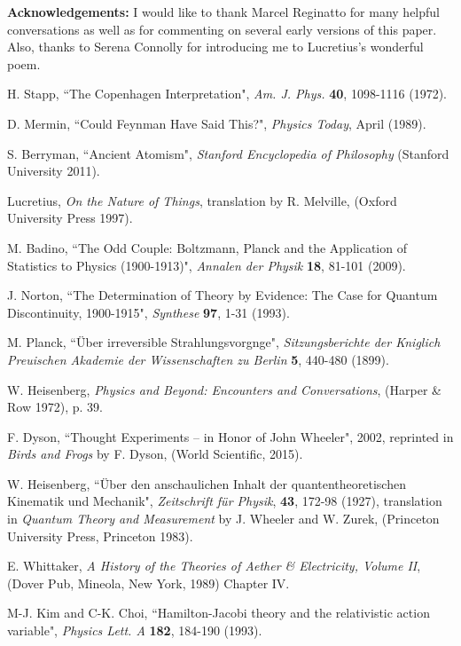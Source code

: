 \documentclass[12pt]{article}
\begin{document}
\textbf{Acknowledgements:}
I would like to thank Marcel Reginatto for many helpful conversations as well as for commenting on several early versions of this paper.  Also, thanks to Serena Connolly for introducing me to Lucretius's wonderful poem.

\begin{thebibliography}{99}

 H. Stapp, ``The Copenhagen Interpretation", {\it Am. J. Phys.} \textbf{40}, 1098-1116 (1972).

 D.  Mermin, ``Could Feynman Have Said This?", {\it Physics Today}, April (1989).  

 S. Berryman, ``Ancient Atomism", {\it Stanford Encyclopedia of Philosophy} (Stanford University 2011).

 Lucretius, {\it On the Nature of Things}, translation by R. Melville, (Oxford University Press 1997). 

 M. Badino, ``The Odd Couple: Boltzmann, Planck and the Application of Statistics to Physics (1900-1913)", {\it Annalen der Physik} \textbf{18}, 81-101 (2009).

 J. Norton, ``The Determination of Theory by Evidence: The Case for Quantum Discontinuity, 1900-1915", {\it Synthese} \textbf{97}, 1-31 (1993).

 M. Planck, ``\"Uber irreversible Strahlungsvorgnge", {\it Sitzungsberichte der Kniglich Preuischen Akademie der Wissenschaften zu Berlin } \textbf{5}, 440-480 (1899).

 W. Heisenberg, {\it Physics and Beyond: Encounters and Conversations}, (Harper \& Row 1972), p. 39.

 F. Dyson, ``Thought Experiments -- in Honor of John Wheeler", 2002, reprinted in {\it Birds and Frogs} by F. Dyson, (World Scientific, 2015).

 W. Heisenberg, ``\"{U}ber den anschaulichen Inhalt der quantentheoretischen Kinematik und Mechanik", {\it Zeitschrift f\"{u}r Physik}, \textbf{43}, 172-98 (1927), translation in {\it Quantum Theory and Measurement} by J. Wheeler and W. Zurek, (Princeton University Press, Princeton 1983).

 E. Whittaker, {\it A History of the Theories of Aether \& Electricity, Volume II}, (Dover Pub, Mineola, New York, 1989) Chapter IV.

 M-J. Kim and C-K. Choi, ``Hamilton-Jacobi theory and the relativistic action variable", {\it Physics Lett. A} \textbf{182}, 184-190 (1993).


\end{thebibliography}
\end{document}
